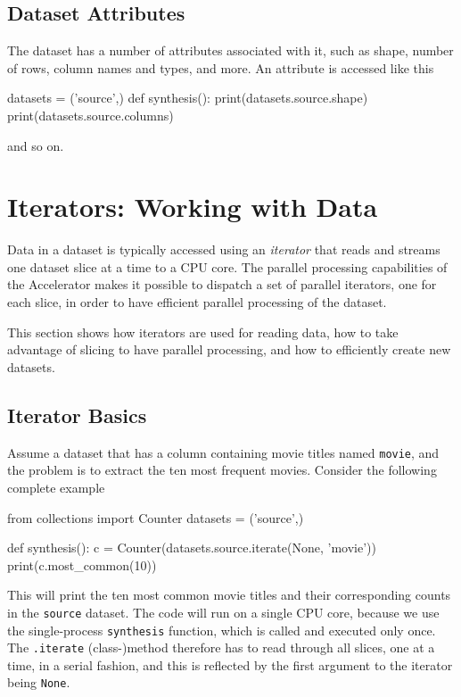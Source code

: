 \subsection{Dataset Attributes}
The dataset has a number of attributes associated with it, such as
shape, number of rows, column names and types, and more.
An attribute is accessed like this
\begin{python}
datasets = ('source',)
def synthesis():
    print(datasets.source.shape)
    print(datasets.source.columns)
\end{python}
and so on.



\section{Iterators: Working with Data}

Data in a dataset is typically accessed using an \emph{iterator} that
reads and streams one dataset slice at a time to a CPU core.  The
parallel processing capabilities of the Accelerator makes it possible
to dispatch a set of parallel iterators, one for each slice, in order
to have efficient parallel processing of the dataset.

This section shows how iterators are used for reading data, how to
take advantage of slicing to have parallel processing, and how to
efficiently create new datasets.

\subsection{Iterator Basics}

Assume a dataset that has a column containing movie titles named
\texttt{movie}, and the problem is to extract the ten most frequent
movies.  Consider the following complete example
\begin{python}
from collections import Counter
datasets = ('source',)

def synthesis():
    c = Counter(datasets.source.iterate(None, 'movie'))
    print(c.most_common(10))
\end{python}
This will print the ten most common movie titles and their
corresponding counts in the \texttt{source} dataset.  The code will
run on a single CPU core, because we use the single-process
\texttt{synthesis} function, which is called and executed only once.
The \texttt{.iterate} (class-)method therefore has to read through all
slices, one at a time, in a serial fashion, and this is reflected by
the first argument to the iterator being \texttt{None}.



